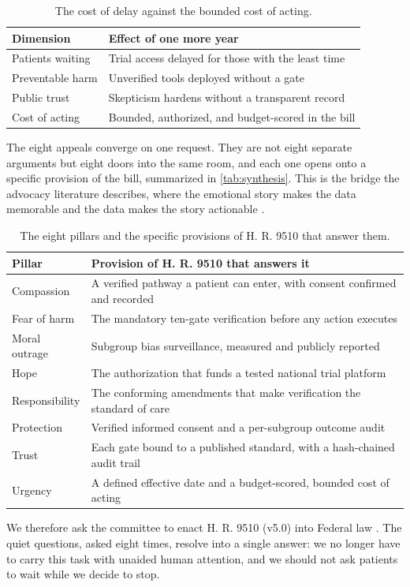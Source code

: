 \begin{table}[H]
\footnotesize
\begin{tabularx}{\textwidth}{@{}L{6.4cm} Y@{}}
\toprule
\textbf{Dimension} & \textbf{Effect of one more year}\\
\midrule
Patients waiting & Trial access delayed for those with the least time\\
Preventable harm & Unverified tools deployed without a gate\\
Public trust & Skepticism hardens without a transparent record\\
Cost of acting & Bounded, authorized, and budget-scored in the bill\\
\bottomrule
\end{tabularx}
\caption{The cost of delay against the bounded cost of acting.}
\label{tab:urgency}
\end{table}

\clearpage

The eight appeals converge on one request. They are not eight separate arguments
but eight doors into the same room, and each one opens onto a specific provision
of the bill, summarized in \autoref{tab:synthesis}. This is the bridge the
advocacy literature describes, where the emotional story makes the data memorable
and the data makes the story actionable \cite{moreland2015hearing, kok2013finding}.

\begin{table}[H]
\footnotesize
\begin{tabularx}{\textwidth}{@{}L{4.0cm} Y@{}}
\toprule
\textbf{Pillar} & \textbf{Provision of H. R. 9510 that answers it}\\
\midrule
Compassion & A verified pathway a patient can enter, with consent confirmed and recorded\\
Fear of harm & The mandatory ten-gate verification before any action executes\\
Moral outrage & Subgroup bias surveillance, measured and publicly reported\\
Hope & The authorization that funds a tested national trial platform\\
Responsibility & The conforming amendments that make verification the standard of care\\
Protection & Verified informed consent and a per-subgroup outcome audit\\
Trust & Each gate bound to a published standard, with a hash-chained audit trail\\
Urgency & A defined effective date and a budget-scored, bounded cost of acting\\
\bottomrule
\end{tabularx}
\caption{The eight pillars and the specific provisions of H. R. 9510 that answer them.}
\label{tab:synthesis}
\end{table}

We therefore ask the committee to enact H. R. 9510 (v5.0) into Federal law
\cite{Kawchak2026HR9510Bill}. The quiet questions, asked eight times, resolve into
a single answer: we no longer have to carry this task with unaided human attention,
and we should not ask patients to wait while we decide to stop.
